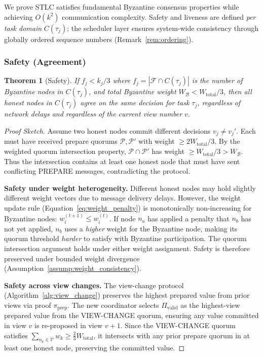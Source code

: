 \documentclass[manuscript,screen,review]{acmart}
\newtheorem{theorem}{Theorem}
\begin{document}
We prove STLC satisfies fundamental Byzantine consensus properties while achieving $O(k^2)$ communication complexity. Safety and liveness are defined \emph{per task domain} $C(\tau_j)$; the scheduler layer ensures system-wide consistency through globally ordered sequence numbers (Remark~\ref{rem:ordering}).

\subsubsection{Safety (Agreement)}
\label{sec:safety_theorem}

\begin{theorem}[Safety]
\label{thm:safety}
If $f_j < k_j/3$ where $f_j = |\mathcal{F} \cap C(\tau_j)|$ is the number of Byzantine nodes in $C(\tau_j)$, and total Byzantine weight $W_{\mathcal{B}} < W_{\text{total}}/3$, then all honest nodes in $C(\tau_j)$ agree on the same decision for task $\tau_j$, regardless of network delays and regardless of the current view number $v$.
\end{theorem}

\begin{proof}[Proof Sketch]
Assume two honest nodes commit different decisions $v_j \neq v_j'$. Each must have received prepare quorums $\mathcal{P}, \mathcal{P}'$ with weight $\geq 2W_{\text{total}}/3$. By the weighted quorum intersection property, $\mathcal{P} \cap \mathcal{P}'$ has weight $\geq W_{\text{total}}/3 > W_{\mathcal{B}}$. Thus the intersection contains at least one honest node that must have sent conflicting PREPARE messages, contradicting the protocol.

\textbf{Safety under weight heterogeneity.} Different honest nodes may hold slightly different weight vectors due to message delivery delays. However, the weight update rule (Equation~\ref{eq:weight_penalty}) is monotonically non-increasing for Byzantine nodes: $w_i^{(t+1)} \leq w_i^{(t)}$. If node $n_a$ has applied a penalty that $n_b$ has not yet applied, $n_b$ uses a \emph{higher} weight for the Byzantine node, making its quorum threshold \emph{harder} to satisfy with Byzantine participation. The quorum intersection argument holds under either weight assignment. Safety is therefore preserved under bounded weight divergence (Assumption~\ref{assump:weight_consistency}).

\textbf{Safety across view changes.} The view-change protocol (Algorithm~\ref{alg:view_change}) preserves the highest prepared value from prior views via proof $\pi_{\text{prep}}$. The new coordinator selects $\Pi_{\text{valid}}$ as the highest-view prepared value from the VIEW-CHANGE quorum, ensuring any value committed in view $v$ is re-proposed in view $v+1$. Since the VIEW-CHANGE quorum satisfies $\sum_{n_k \in \mathcal{V}} w_k \geq \frac{2}{3} W_{\text{total}}$, it intersects with any prior prepare quorum in at least one honest node, preserving the committed value.
\end{proof}
\end{document}
